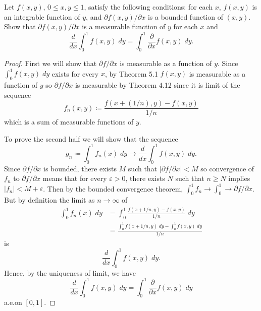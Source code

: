 \begin{problem}
Let $f(x,y)$, $0\leq x,y\leq 1$, satisfy the following conditions: for each
$x$, $f(x,y)$ is an integrable function of $y$, and
$\partial f(x,y)/\partial x$ is a bounded function of $(x,y)$. Show that
$\partial f(x,y)/\partial x$ is a measurable function of $y$ for each $x$
and
\[
\frac{d}{dx}\int_0^1f(x,y)\;dy=\int_0^1\frac{\partial}{\partial x}f(x,y)\;dy.
\]
\end{problem}
\begin{proof}
First we will show that $\partial f/\partial x$ is measurable as a function
of $y$. Since $\int_0^1 f(x,y)\;dy$ exists for every $x$, by Theorem 5.1
$f(x,y)$ is measurable as a function of $y$ so $\partial f/\partial x$ is
measurable by Theorem 4.12 since it is limit of the sequence
\begin{equation}
\label{eq:diff-sequence}
f_n(x,y)\coloneqq\frac{f(x+(1/n),y)-f(x,y)}{1/n}
\end{equation}
which is a sum of measurable functions of $y$.

To prove the second half we will show that the sequence
\begin{equation}
\label{eq:seq-derivatives-of-ints}
g_n\coloneqq\int_0^1 f_n(x)\;dy\longrightarrow
\frac{d}{dx}\int_0^1 f(x,y)\;dy.
\end{equation}
Since $\partial f/\partial x$ is bounded, there exists $M$ such that
$\left|\partial f/\partial x\right|<M$ so convergence of $f_n$ to $\partial
f/\partial x$ means that for every $\varepsilon>0$, there exists $N$ such
that $n\geq N$ implies $\left|f_n\right|<M+\varepsilon$. Then by the
bounded convergence theorem, $\int_0^1 f_n\to\int_0^1\to\partial f/\partial
x$. But by definition the limit as $n\to\infty$ of
\begin{align*}
\int_0^1f_n(x)\;dy
&=\int_0^1\frac{f(x+1/n,y)-f(x,y)}{1/n}\;dy\\
&=\frac{\int_0^1 f(x+1/n,y)\;dy-\int_0^1 f(x,y)\;dy}{1/n}
\end{align*}
is
\[
\frac{d}{dx}\int_0^1 f(x,y)\;dy.
\]
Hence, by the uniqueness of limit, we have
\[
\frac{d}{dx}\int_0^1f(x,y)\;dy=\int_0^1\frac{\partial}{\partial x}f(x,y)\;dy
\]
a.e.\@ on $[0,1]$.
\end{proof}
\newpage


